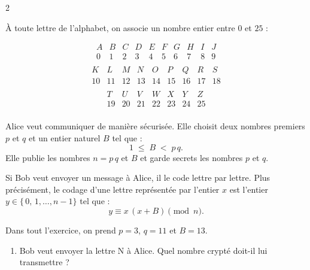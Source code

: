 \documentclass[a4paper,12pt]{article}
\begin{document}
\begin{multicols}{2}
\begin{exercice}[title=Exercice 28 $\star\star\star$ { [Modéliser, Calculer] }]{}{}
\begin{enumerate}
  \end{enumerate}
\end{exercice}
\begin{exercice}[title=Exercice 29 $\star\star\star$ { [Modéliser, Calculer] }]{}{}
  À toute lettre de l'alphabet, on associe un nombre entier entre \(0\) et \(25\) :

  \[
    \begin{array}{ccccccccccccc}
      A & B & C & D & E & F & G & H & I & J \\
      0 & 1 & 2 & 3 & 4 & 5 & 6 & 7 & 8 & 9 \\
    \end{array}
  \]
  \[
    \begin{array}{cccccccccccc}
      K & L & M & N & O & P & Q & R & S \\
      10 & 11 & 12 & 13 & 14 & 15 & 16 & 17 & 18 \\
    \end{array}
  \]
  \[
    \begin{array}{ccccccc}
      T & U & V & W & X & Y & Z \\
      19 & 20 & 21 & 22 & 23 & 24 & 25 \\
    \end{array}
  \]

  \medskip

  Alice veut communiquer de manière sécurisée. Elle choisit deux nombres premiers \(p\) et \(q\) et un entier naturel \(B\) tel que :
  \[
    1 \;\le\; B \;<\; p\,q.
  \]
  Elle publie les nombres \(n = p\,q\) et \(B\) et garde secrets les nombres \(p\) et \(q\).

  Si Bob veut envoyer un message à Alice, il le code lettre par lettre. Plus précisément, le codage d'une lettre représentée par l'entier \(x\) est l'entier \(y \in \{\,0,\,1,\dots,n-1\}\) tel que :
  \[
    y \equiv x\,(x + B) \pmod{n}.
  \]

  \medskip
  Dans tout l'exercice, on prend \(p = 3\), \(q = 11\) et \(B = 13\).

  \begin{enumerate}
    \item Bob veut envoyer la lettre N à Alice.
      Quel nombre crypté doit-il lui transmettre ?


\end{enumerate}
\end{exercice}
\end{multicols}
\end{document}
